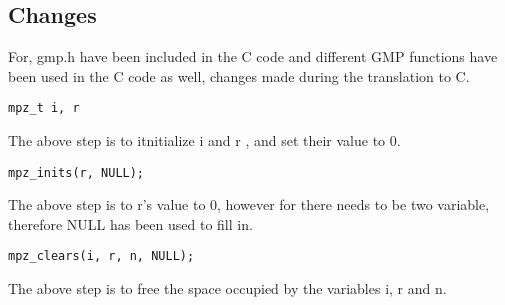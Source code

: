 \documentclass[a4paper]{article}
\begin{document}
\subsection{Changes}
For, gmp.h have been included in the C code and different GMP functions have been used in the C code as well, changes made during the translation to C.
\begin{lstlisting}
mpz_t i, r
\end{lstlisting} The above step is to itnitialize i and r , and set their value to 0.
\begin{lstlisting}
mpz_inits(r, NULL);
\end{lstlisting}
The above step is to r's value to 0, however for there needs to be two variable, therefore NULL has been used to fill in.
\begin{lstlisting}
mpz_clears(i, r, n, NULL);
\end{lstlisting}
The above step is to free the space occupied by the variables i, r and n.
\end{document}
